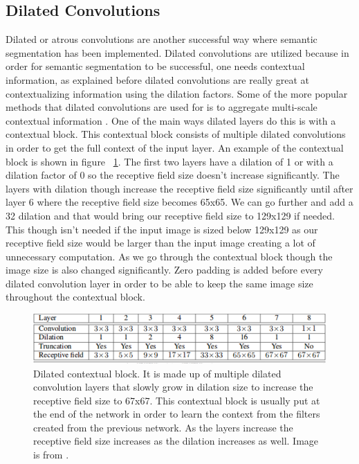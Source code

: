 \subsection{Dilated Convolutions}
Dilated or atrous convolutions are another successful way where semantic segmentation has been implemented. 
Dilated convolutions are utilized because in order for semantic segmentation to be successful, one needs contextual information, as explained before dilated convolutions are really great at contextualizing information using the dilation factors. 
Some of the more popular methods that dilated convolutions are used for is to aggregate multi-scale contextual information  \cite{Yu2016MultiScaleCA}. 
One of the main ways dilated layers do this is with a contextual block. 
This contextual block consists of multiple dilated convolutions in order to get the full context of the input layer. 
An example of the contextual block is shown in figure ~\ref{fig_dilated_context}. 
The first two layers have a dilation of 1 or with a dilation factor of 0 so the receptive field size doesn't increase significantly. 
The layers with dilation though increase the receptive field size significantly until after layer 6 where the receptive field size becomes 65x65. 
We can go further and add a 32 dilation and that would bring our receptive field size to 129x129 if needed. 
This though isn't needed if the input image is sized below 129x129 as our receptive field size would be larger than the input image creating a lot of unnecessary computation. 
As we go through the contextual block though the image size is also changed significantly. 
Zero padding is added before every dilated convolution layer in order to be able to keep the same image size throughout the contextual block.

\begin{figure}[tbh]
\centering
\includegraphics[width=\textwidth]{Context_dilation.png}
\caption{Dilated contextual block. It is made up of multiple dilated convolution layers that slowly grow in dilation size to increase the receptive field size to 67x67. This contextual block is usually put at the end of the network in order to learn the context from the filters created from the previous network. As the layers increase the receptive field size increases as the dilation increases as well. Image is from \cite{Yu2016MultiScaleCA}.}
\label{fig_dilated_context}
\end{figure}
 
